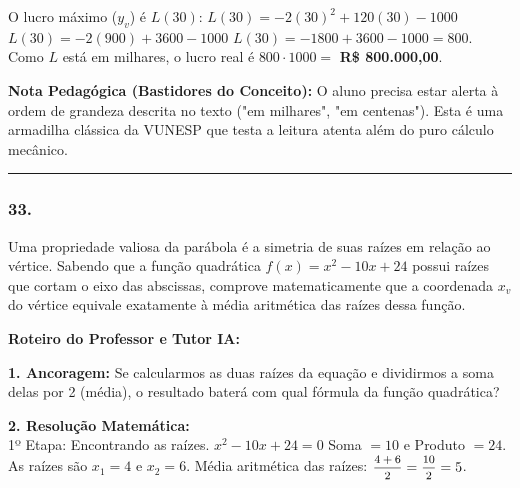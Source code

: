 \begin{multicols*}{2}
\begin{tcolorbox}[colback=CorTitUm!5, colframe=CorTitUm, boxrule=1pt, arc=4pt, left=6pt, right=6pt, top=6pt, bottom=6pt]
    O lucro máximo ($y_v$) é $L(30)$:
    $L(30) = -2(30)^2 + 120(30) - 1000$
    $L(30) = -2(900) + 3600 - 1000$
    $L(30) = -1800 + 3600 - 1000 = 800$.
    Como $L$ está em milhares, o lucro real é $800 \cdot 1000 = $ \textbf{R\$ 800.000,00}.
    \end{tcolorbox}
    \vspace{0.15cm}
    
    \begin{boxexplicacao}
    \textbf{Nota Pedagógica (Bastidores do Conceito):} O aluno precisa estar alerta à ordem de grandeza descrita no texto ("em milhares", "em centenas"). Esta é uma armadilha clássica da VUNESP que testa a leitura atenta além do puro cálculo mecânico.
    \end{boxexplicacao}
\fi

\par\vspace{\espacoQuestao}

\noindent\textcolor{CorLinha}{\rule{\linewidth}{0.5pt}} 
\par\vspace{\espacoPreQuestao}
\subsubsection*{33.} 
\begin{enunciadoLiteral}
Uma propriedade valiosa da parábola é a simetria de suas raízes em relação ao vértice. Sabendo que a função quadrática $f(x) = x^2 - 10x + 24$ possui raízes que cortam o eixo das abscissas, comprove matematicamente que a coordenada $x_v$ do vértice equivale exatamente à média aritmética das raízes dessa função.
\end{enunciadoLiteral}

\ifgabarito
    \begin{tcolorbox}[colback=CorTitUm!5, colframe=CorTitUm, boxrule=1pt, arc=4pt, left=6pt, right=6pt, top=6pt, bottom=6pt]
    \small\textbf{\textcolor{CorTitUm}{Roteiro do Professor e Tutor IA:}}\par\vspace{0.1cm}
    \color{CinzaEscuro}
    \textbf{1. Ancoragem:} Se calcularmos as duas raízes da equação e dividirmos a soma delas por 2 (média), o resultado baterá com qual fórmula da função quadrática?\par\vspace{0.1cm}
    \textbf{2. Resolução Matemática:}\\
    1º Etapa: Encontrando as raízes.
    $x^2 - 10x + 24 = 0$
    Soma $= 10$ e Produto $= 24$. As raízes são $x_1 = 4$ e $x_2 = 6$.
    Média aritmética das raízes: $\mfrac{4 + 6}{2} = \mfrac{10}{2} = 5$.
    

\end{tcolorbox}
\end{multicols*}
